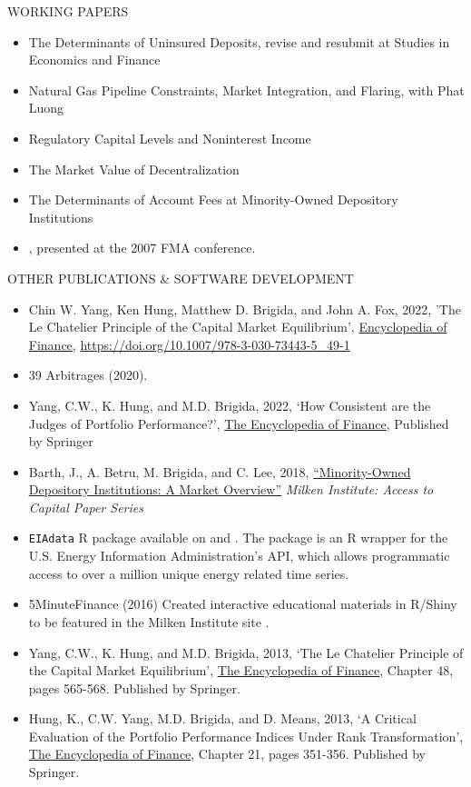 \documentclass[9pt]{article}
\begin{document}
\vspace{10pt}
WORKING PAPERS
\begin{itemize}[noitemsep, nolistsep]
\item The Determinants of Uninsured Deposits, revise and resubmit at Studies in Economics and Finance
\item Natural Gas Pipeline Constraints, Market Integration, and Flaring, with Phat Luong
\item Regulatory Capital Levels and Noninterest Income
\item The Market Value of Decentralization
\item The Determinants of Account Fees at Minority-Owned Depository Institutions
\item \href{https://docs.google.com/file/d/0B46EsGCAlLnPdmxsT3ZtVGk5Wkk/edit?usp=sharing}{\color{Blue}{Almost Stochastic Dominance: A Penchant for Risk}}, presented at the 2007 FMA conference.
\end{itemize}
\vspace{10pt}
OTHER PUBLICATIONS \& SOFTWARE DEVELOPMENT
\begin{itemize}[noitemsep, nolistsep]
\item Chin W. Yang, Ken Hung, Matthew D. Brigida, and John A. Fox, 2022, 'The Le Chatelier Principle of the Capital Market Equilibrium', \underline{Encyclopedia of Finance}, \url{https://doi.org/10.1007/978-3-030-73443-5_49-1}
\item 39 Arbitrages (2020).
\item Yang, C.W., K. Hung, and M.D. Brigida, 2022, `How Consistent are the Judges of Portfolio Performance?', \underline{The Encyclopedia of Finance}, Published by Springer
\item Barth, J., A. Betru, M. Brigida, and C. Lee, 2018, \href{https://assets1b.milkeninstitute.org/assets/Publication/ResearchReport/PDF/MDIs-A-Market-Overview-7.18.18-FINAL.pdf}{\color{Blue}``Minority-Owned Depository Institutions: A Market Overview''} {\it Milken Institute: Access to Capital Paper Series}
\item \texttt{EIAdata} R package available on \href{http://cran.r-project.org/package=EIAdata}{\color{Blue}{CRAN (stable)}} and \href{https://github.com/Matt-Brigida/EIAdata}{\color{Blue}{Github (development)}}.  The package is an R wrapper for the U.S. Energy Information Administration's API, which allows programmatic access to over a million unique energy related time series.
\item 5MinuteFinance (2016) Created interactive educational materials in R/Shiny to be featured in the Milken Institute site {\color{blue}{5MinuteFinance.org}}. 
\item Yang, C.W., K. Hung, and M.D. Brigida, 2013, `The Le Chatelier Principle of the Capital Market Equilibrium', \underline{The
Encyclopedia of Finance}, Chapter 48, pages 565-568. Published by Springer.
\item Hung, K., C.W. Yang, M.D. Brigida, and D. Means, 2013, `A Critical Evaluation of the Portfolio Performance
Indices Under Rank Transformation', \underline{The Encyclopedia of Finance}, Chapter 21, pages 351-356. Published by
Springer.
\end{itemize}
\end{document}
